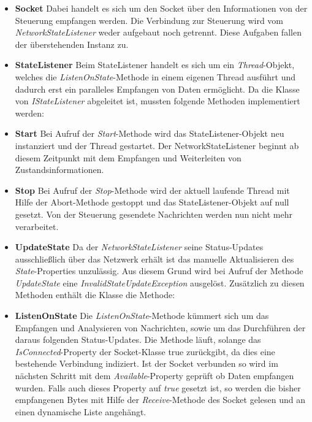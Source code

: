 \begin{itemize}
\item \textbf{Socket}
\newline
Dabei handelt es sich um den Socket über den Informationen von der Steuerung empfangen werden. Die Verbindung zur Steuerung wird vom \textit{NetworkStateListener} weder aufgebaut noch getrennt. Diese Aufgaben fallen der überstehenden Instanz zu.
\item \textbf{StateListener}
\newline
Beim StateListener handelt es sich um ein \textit{Thread}-Objekt, welches die \textit{ListenOnState}-Methode in einem eigenen Thread ausführt und dadurch erst ein paralleles Empfangen von Daten ermöglicht.
Da die Klasse von \textit{IStateListener} abgeleitet ist, mussten folgende Methoden implementiert werden:
\item \textbf{Start}
\newline
Bei Aufruf der \textit{Start}-Methode wird das StateListener-Objekt neu instanziert und der Thread gestartet. Der NetworkStateListener beginnt ab diesem Zeitpunkt mit dem Empfangen und Weiterleiten von Zustandsinformationen. 
\item \textbf{Stop}
\newline
Bei Aufruf der \textit{Stop}-Methode wird der aktuell laufende Thread mit Hilfe der Abort-Methode gestoppt und das StateListener-Objekt auf null gesetzt. Von der Steuerung gesendete Nachrichten werden nun nicht mehr verarbeitet.
\item \textbf{UpdateState}
\newline
Da der \textit{NetworkStateListener} seine Status-Updates ausschließlich über das Netzwerk erhält ist das manuelle Aktualisieren des \textit{State}-Properties unzulässig. Aus diesem Grund wird bei Aufruf der Methode \textit{UpdateState} eine \textit{InvalidStateUpdateException} ausgelöst.
Zusätzlich zu diesen Methoden enthält die Klasse die Methode:
\item \textbf{ListenOnState}
\newline
Die \textit{ListenOnState}-Methode kümmert sich um das Empfangen und Analysieren von Nachrichten, sowie um das Durchführen der daraus folgenden Status-Updates. 
Die Methode läuft, solange das \textit{IsConnected}-Property der Socket-Klasse true zurückgibt, da dies eine bestehende Verbindung indiziert. Ist der Socket verbunden so wird im nächsten Schritt mit dem \textit{Available}-Property geprüft ob Daten empfangen wurden. Falls auch dieses Property auf \textit{true} gesetzt ist, so werden die bisher empfangenen Bytes mit Hilfe der \textit{Receive}-Methode des Socket gelesen und an einen dynamische Liste angehängt. 

\end{itemize}
